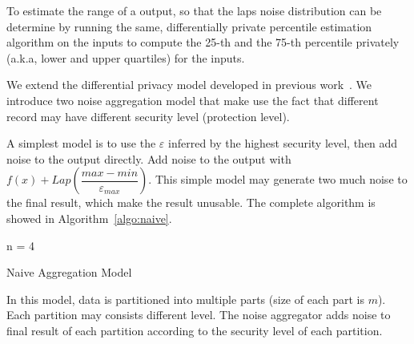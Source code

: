 % 
To estimate the range of a output, so that the laps noise distribution
can be determine by running the same, differentially private percentile 
estimation algorithm on the inputs to compute the 25-th and the 75-th 
percentile privately (a.k.a, lower and upper quartiles) for the inputs.

We extend the differential privacy model developed in previous
work~\cite{differentialdp:stoc11}. We introduce two noise aggregation model
that make use the fact that different record may have
different security level (protection level).

A simplest model is to use the $\varepsilon$ inferred by the highest security
level, then add noise to the output directly.
Add noise to the output with $f(x) + Lap(\dfrac{max - min}{\varepsilon_{max}})$.
This simple model may generate two much noise to the final result, which
make the result unusable. The complete algorithm is showed in 
Algorithm~\ref{algo:naive}.

\begin{algorithm}[t]
\SetAlgoLined
{}
  n = 4

 \caption{Naive Aggregation Model}
 \label{algo:naive}
\end{algorithm}

In this model, data is partitioned into multiple parts (size of each part is 
$m$). Each partition may consists
different level. The noise aggregator adds noise to final result of each 
partition
according to the security level of each partition.

